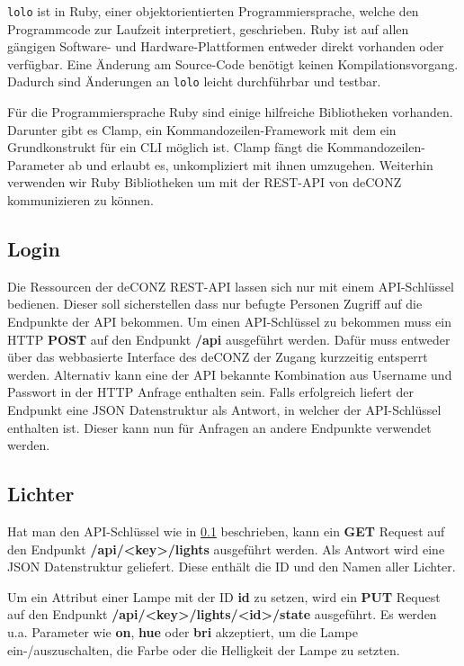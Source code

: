 \documentclass[a4paper,12pt]{article}
\begin{document}
\texttt{lolo} ist in Ruby, einer objektorientierten Programmiersprache, welche den
Programmcode zur Laufzeit interpretiert, geschrieben. Ruby ist auf allen
gängigen Software- und Hardware-Plattformen entweder direkt vorhanden oder
verfügbar. Eine Änderung am Source-Code benötigt keinen Kompilationsvorgang.
Dadurch sind Änderungen an \texttt{lolo} leicht durchführbar und testbar.

Für die Programmiersprache Ruby sind einige hilfreiche Bibliotheken vorhanden.
Darunter gibt es Clamp, ein Kommandozeilen-Framework mit dem ein Grundkonstrukt
für ein CLI möglich ist. Clamp fängt die Kommandozeilen-Parameter ab und
erlaubt es, unkompliziert mit ihnen umzugehen. Weiterhin verwenden wir Ruby
Bibliotheken um mit der REST-API von deCONZ kommunizieren zu können.

\subsection{Login}
\label{api-login}

Die Ressourcen der deCONZ REST-API lassen sich nur mit einem API-Schlüssel
bedienen. Dieser soll sicherstellen dass nur befugte Personen Zugriff auf die
Endpunkte der API bekommen. Um einen API-Schlüssel zu bekommen muss ein HTTP
\textbf{POST} auf den Endpunkt \textbf{/api} ausgeführt werden. Dafür muss
entweder über das webbasierte Interface des deCONZ der Zugang kurzzeitig
entsperrt werden. Alternativ kann eine der API bekannte Kombination aus
Username und Passwort in der HTTP Anfrage enthalten sein. Falls erfolgreich
liefert der Endpunkt eine JSON Datenstruktur als Antwort, in welcher der
API-Schlüssel enthalten ist. Dieser kann nun für Anfragen an andere Endpunkte
verwendet werden.


\subsection{Lichter}
\label{api-lichter}

Hat man den API-Schlüssel wie in \ref{api-login} beschrieben, kann ein
\textbf{GET} Request auf den Endpunkt \textbf{/api/<key>/lights} ausgeführt
werden. Als Antwort wird eine JSON Datenstruktur geliefert. Diese enthält
die ID und den Namen aller Lichter.

Um ein Attribut einer Lampe mit der ID \textbf{id} zu setzen, wird ein
\textbf{PUT} Request auf den Endpunkt
\textbf{/api/<key>/lights/<id>/state} ausgeführt. Es werden u.a. Parameter
wie \textbf{on}, \textbf{hue} oder \textbf{bri} akzeptiert, um die Lampe
ein-/auszuschalten, die Farbe oder die Helligkeit der Lampe zu setzten.
\end{document}
